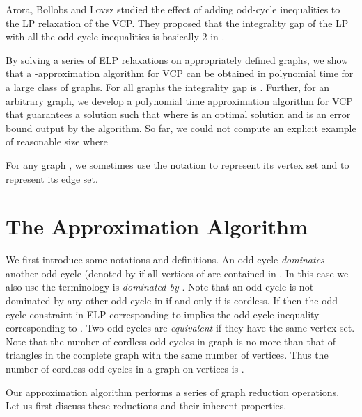 \documentclass[12pt]{article}
\begin{document}
\vskip 5pt

Arora, Bollobs and Lovsz \cite{arora} studied
the effect of adding odd-cycle inequalities to the LP relaxation of
the VCP. They proposed that the integrality gap of the LP with all
the odd-cycle inequalities is basically 2 in \cite{arora}.

\vskip 5pt

By solving a series of ELP relaxations on appropriately defined
graphs, we show that a -approximation algorithm for VCP
can be obtained in polynomial time for a large class  of
graphs.
For all
graphs  the integrality gap is .
Further, for an arbitrary graph, we develop a polynomial time
approximation algorithm for VCP that guarantees a solution 
such that  where  is an optimal
solution and  is an error bound output by the algorithm.
So far, we could not compute an explicit example of reasonable size
 where 

\vskip 5pt

For any graph , we sometimes use the notation  to represent
its vertex set and  to represent its edge set.


\section{The Approximation Algorithm}\label{ELPA}
We first introduce some notations and
definitions. An odd cycle  \emph{dominates} another odd
cycle  (denoted by  if all
vertices of  are contained in . In this case
we also use the terminology  is \emph{dominated by}
. Note that an odd cycle  is not dominated by
any other odd cycle in  if and only if  is cordless. If
 then the odd cycle constraint in ELP
corresponding to  implies the odd cycle inequality
corresponding to .  Two odd cycles are \emph{equivalent}
if they have the same vertex set. Note that the number of cordless
odd-cycles in graph  is no more than that of triangles in the
complete graph with the same number  of vertices. Thus the
number of cordless odd cycles in a graph on  vertices is  .

\vskip 5pt

Our approximation algorithm performs a series of graph reduction
operations. Let us first discuss these reductions and their inherent
properties.

\vskip 5pt
\end{document}
